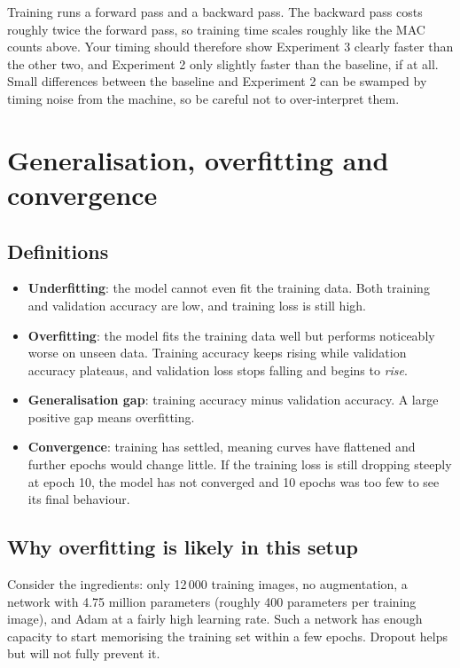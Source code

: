 \documentclass[11pt]{article}
\newcommand{\key}[1]{\textbf{#1}}
\begin{document}
Training runs a forward pass and a backward pass. The backward pass costs roughly twice the forward pass, so training time scales roughly like the MAC counts above. Your timing should therefore show Experiment 3 clearly faster than the other two, and Experiment 2 only slightly faster than the baseline, if at all. Small differences between the baseline and Experiment 2 can be swamped by timing noise from the machine, so be careful not to over-interpret them.

\section{Generalisation, overfitting and convergence}

\subsection{Definitions}

\begin{itemize}[noitemsep]
\item \key{Underfitting}: the model cannot even fit the training data. Both training and validation accuracy are low, and training loss is still high.
\item \key{Overfitting}: the model fits the training data well but performs noticeably worse on unseen data. Training accuracy keeps rising while validation accuracy plateaus, and validation loss stops falling and begins to \emph{rise}.
\item \key{Generalisation gap}: training accuracy minus validation accuracy. A large positive gap means overfitting.
\item \key{Convergence}: training has settled, meaning curves have flattened and further epochs would change little. If the training loss is still dropping steeply at epoch 10, the model has not converged and 10 epochs was too few to see its final behaviour.
\end{itemize}

\subsection{Why overfitting is likely in this setup}

Consider the ingredients: only 12\,000 training images, no augmentation, a network with 4.75 million parameters (roughly 400 parameters per training image), and Adam at a fairly high learning rate. Such a network has enough capacity to start memorising the training set within a few epochs. Dropout helps but will not fully prevent it.
\end{document}
